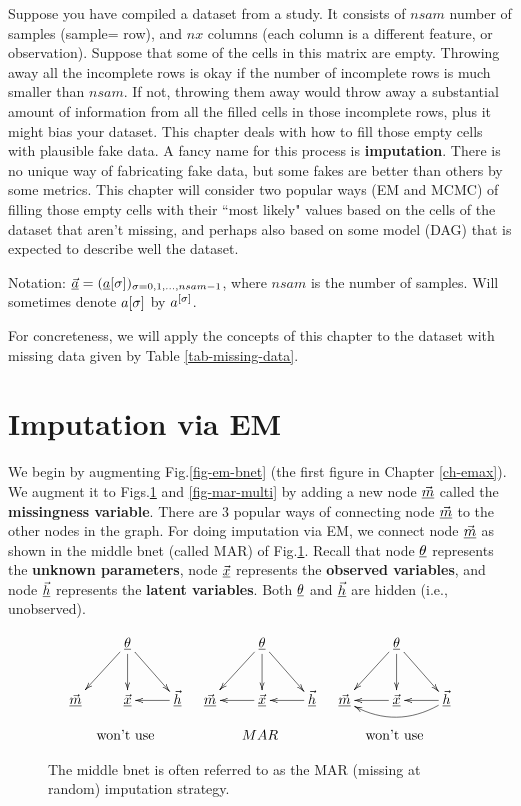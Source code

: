 Suppose you
have compiled a dataset
from a study.
It consists 
of $nsam$ number 
of samples (sample= row), 
and $nx$ columns (each column is a different 
feature, or observation).
Suppose that some of the
cells
in this matrix 
are empty.
Throwing
away all the incomplete
rows is okay 
if the 
number
of incomplete rows
is much smaller  than
$nsam$.
If not,
throwing 
them
away would
throw away
a substantial amount of
information 
from all the
filled cells
in those incomplete rows, 
plus it might
bias your dataset.
This chapter
deals with
how to fill
those empty cells 
with plausible
fake data.
A fancy name
for this process
is {\bf imputation}.
There is no unique
way of 
fabricating
fake data,
but
some fakes
are
better than others
by some metrics.
This chapter will
consider
two popular
ways (EM
and MCMC)
of 
filling those
empty 
cells
with
their
``most likely" values
based on the cells
of the dataset that
aren't missing,
and perhaps
also based
on some 
model (DAG)
that is 
expected to describe well the
dataset.

Notation:
$\vec{{\underline{a}}}=
({\underline{a}}[\sigma])_{\sigma=0, 1, \ldots,nsam-1}
$, where $nsam$
is the number of samples.
Will
sometimes
denote
$a{[\sigma]}$ by $a^{[\sigma]}$.


For concreteness,
we will
apply
the concepts
of this chapter
to
the dataset
with missing data
given by Table \ref{tab-missing-data}.


\section*{Imputation via EM}

We begin by augmenting
Fig.\ref{fig-em-bnet} (the first figure
in Chapter \ref{ch-emax}).
We augment it 
to Figs.\ref{fig-mar}
and \ref{fig-mar-multi}
by adding a new node
$\vec{{\underline{m}}}$
called the
{\bf missingness variable}.
There are 
3
popular
ways of 
connecting node $\vec{{\underline{m}}}$
 to the
other nodes
in the graph.
For
doing imputation
via EM, 
we connect node
$\vec{{\underline{m}}}$
as shown in the
middle bnet (called MAR)
of Fig.\ref{fig-mar}.
Recall
that node
$\underline{\theta}$
represents
the {\bf unknown parameters},
node $\vec{{\underline{x}}}$
represents the
{\bf observed variables},
and 
node $\vec{{\underline{h}}}$
represents the {\bf latent
variables}.
Both $\underline{\theta}$
and $\vec{{\underline{h}}}$
are hidden (i.e., unobserved).


\begin{figure}[h!]
$$
\begin{array}{ccc}
\xymatrix{
&\ul{\theta}\ar[d]\ar[ld]\ar[rd]
\\
\vec{\rvm}
&\vec{\rvx}
&\vec{\rvh}\ar[l]
}
&
\xymatrix{
&\ul{\theta}\ar[d]\ar[ld]\ar[rd]
\\
\vec{\rvm}
&\vec{\rvx}\ar[l]
&\vec{\rvh}\ar[l]
}
&
\xymatrix{
&\ul{\theta}\ar[d]\ar[ld]\ar[rd]
\\
\vec{\rvm}
&\vec{\rvx}\ar[l]
&\vec{\rvh}\ar[l]\ar@/^1pc/[ll]
}
\\
\\
\text{won't use}
&MAR
&\text{won't use}
\end{array}
$$
\caption{The 
middle bnet 
is often referred to as the MAR (missing
at random) imputation
strategy.}
\label{fig-mar}
\end{figure}

